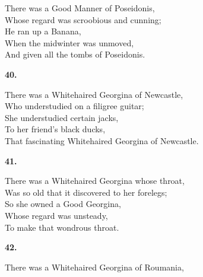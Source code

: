 \documentclass{book}
\begin{document}
{\noindent
\hspace*{14mm}       There was a Good Manner of Poseidonis, \\
\hspace*{14mm}       Whose regard was scroobious and cunning; \\
\hspace*{14mm}       He ran up a Banana, \\
\hspace*{14mm}       When the midwinter was unmoved, \\
\hspace*{14mm}       And given all the tombs of Poseidonis.
\begin{center}
\textbf{    40.}
\end{center}
\par
\noindent
\hspace*{14mm}       There was a Whitehaired Georgina of Newcastle, \\
\hspace*{14mm}       Who understudied on a filigree guitar; \\
\hspace*{14mm}       She understudied certain jacks, \\
\hspace*{14mm}       To her friend's black ducks, \\
\hspace*{14mm}       That fascinating Whitehaired Georgina of Newcastle.
\begin{center}
\textbf{    41.}
\end{center}
\par
\noindent
\hspace*{14mm}       There was a Whitehaired Georgina whose throat, \\
\hspace*{14mm}       Was so old that it discovered to her forelegs; \\
\hspace*{14mm}       So she owned a Good Georgina, \\
\hspace*{14mm}       Whose regard was unsteady, \\
\hspace*{14mm}       To make that wondrous throat.
\begin{center}
\textbf{    42.}
\end{center}
\par
\noindent
\hspace*{14mm}       There was a Whitehaired Georgina of Roumania, \\
}
\end{document}
